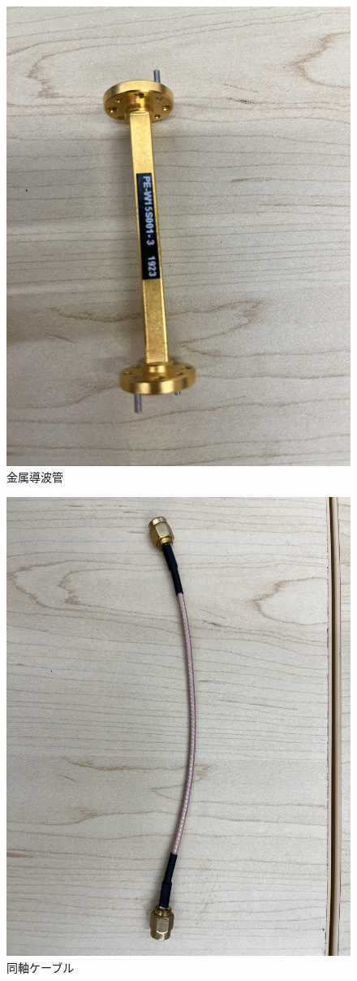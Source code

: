 \documentclass[technicalreport]{ieicej}
\begin{document}
\begin{figure}[tb]
  \begin{center}
    \includegraphics[bb=0.000000 0.000000 593.264305 791.019074, width=0.5\linewidth]{img/metallic_waveguide.pdf}
    \caption{金属導波管}
    \label{fig:metallic_waveguide}
  \end{center}
\end{figure}

\begin{figure}[tb]
  \begin{center}
    \includegraphics[bb=0.000000 0.000000 593.264305 791.019074, width=0.5\linewidth]{img/sma_cables.pdf}
    \caption{同軸ケーブル}
    \label{fig:sma_cables}
  \end{center}
\end{figure}
\end{document}
